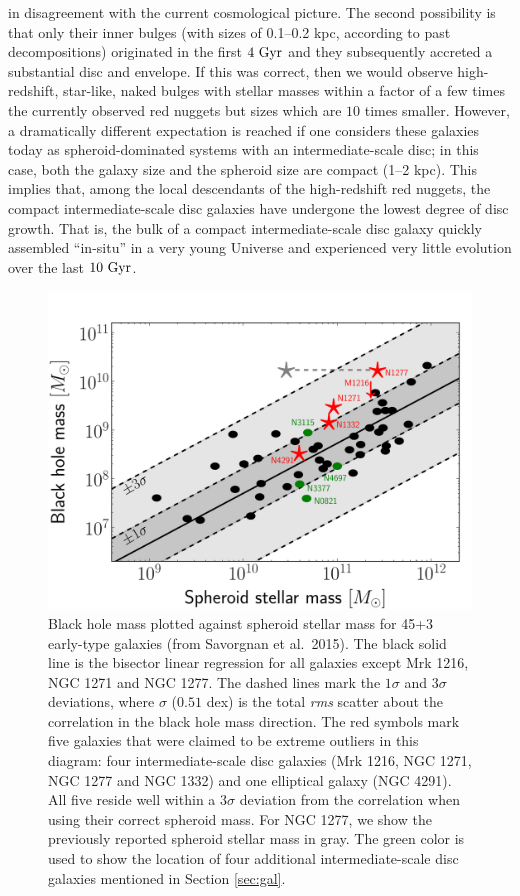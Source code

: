 \documentclass[useAMS,usenatbib,article]{mnras}
\begin{document}
in disagreement with the current cosmological picture. 
The second possibility is that only their inner bulges (with sizes of 0.1--0.2 kpc, 
according to past decompositions) originated in the first $4~\rm Gyr$ 
and they subsequently accreted a substantial disc and envelope. 
If this was correct, then we would observe high-redshift, star-like, naked bulges with stellar masses 
within a factor of a few times the currently observed red nuggets but sizes which are $10$ times smaller. 
However, a dramatically different expectation is reached 
if one considers these galaxies today as spheroid-dominated systems with an intermediate-scale disc; 
in this case, both the galaxy size and the spheroid size are compact (1--2 kpc). 
This implies that, among the local descendants of the high-redshift red nuggets, 
the compact intermediate-scale disc galaxies have undergone the lowest degree of disc growth. 
That is, the bulk of a compact intermediate-scale disc galaxy quickly assembled ``in-situ'' in a very young Universe 
and experienced very little evolution over the last $10~\rm Gyr$.

\begin{figure}
\begin{center}
\includegraphics[width=\columnwidth]{mm.pdf}
\caption{Black hole mass plotted against spheroid stellar mass for 45+3 early-type galaxies (from Savorgnan et al.~2015). 
The black solid line is the bisector linear regression for all galaxies except Mrk 1216, NGC 1271 and NGC 1277. 
The dashed lines mark the $1\sigma$ and $3\sigma$ deviations, 
where $\sigma$ ($0.51$ dex) is the total \emph{rms} scatter about the correlation in the black hole mass direction. 
The red symbols mark five galaxies that were claimed to be extreme outliers in this diagram: 
four intermediate-scale disc galaxies (Mrk 1216, NGC 1271, NGC 1277 and NGC 1332) and one elliptical galaxy (NGC 4291). 
All five reside well within a $3\sigma$ deviation from the correlation when using their correct spheroid mass. 
For NGC 1277, we show the previously reported spheroid stellar mass \citep{vandenbosch2012} in gray. 
The green color is used to show the location of four additional intermediate-scale disc galaxies mentioned in Section \ref{sec:gal}.}
\label{fig:mm}
\end{center}
\end{figure}
\end{document}
